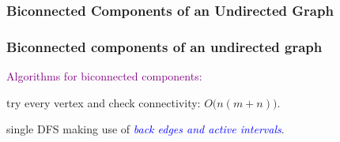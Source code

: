 \subsubsection{Biconnected Components of an Undirected Graph}

\begin{frame}
  \frametitle{Biconnected components of an undirected graph}

  \textcolor{purple}{Algorithms for biconnected components:}
  \begin{description}
    \setlength{\itemsep}{0.20cm}
    \item [Brute force:] try every vertex and check connectivity: $O \big( n(m+n) \big )$.
    \item [Clever approach:] single DFS making use of \textcolor{blue}{\emph{back edges and active intervals}}.
  \end{description}

\end{frame}


